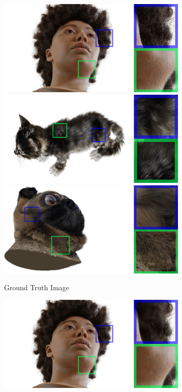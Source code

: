 \begin{figure}[tb]
  \centering
  \begin{subfigure}{0.31\linewidth}
  \includegraphics[width=\linewidth]{images/closeup/khady_gt_22_detail.png}
  \includegraphics[width=\linewidth]{images/closeup/kitten_gt_67_detail.png}
  \includegraphics[width=\linewidth]{images/closeup/pug_gt_25_detail.png}
  \caption{Ground Truth Image}
  \end{subfigure}
  \hfill
  \begin{subfigure}{0.31\linewidth}
  \includegraphics[width=\linewidth]{images/closeup/khady_3dgs_22_detail.png}

\end{subfigure}
\end{figure}
